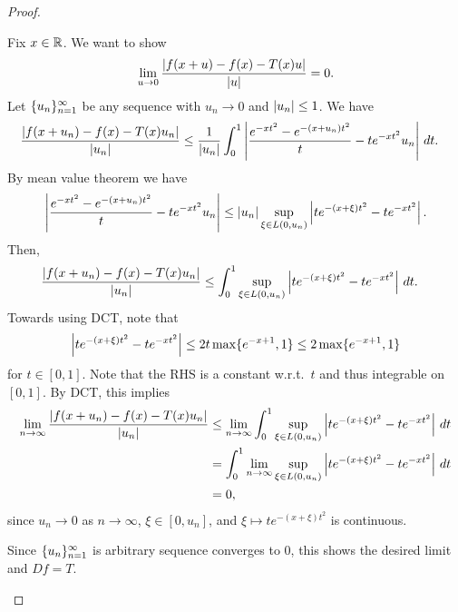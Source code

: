 \documentclass[a4paper]{article}
\begin{document}
\begin{proof}
\begin{enumerate}
          Fix $x \in \mathbb{R}$. We want to show
          \[
            \lim_{u \to 0} \frac{\left\lvert f(x + u) - f(x) - T(x) u\right\rvert}{\left\lvert u\right\rvert} = 0.
          \]
          Let $\{ u_n \}_{n=1}^\infty$ be any sequence with $u_n \to 0$ and
          $\left\lvert u_n\right\rvert \leq 1$. We have
          \begin{align*}
            \frac{\left\lvert f(x + u_n) - f(x) - T(x) u_n\right\rvert}{\left\lvert u_n\right\rvert}
             & \leq \frac{1}{\left\lvert u_n\right\rvert} \int_0^1
            \left\lvert \frac{e^{-x t^2} - e^{-(x + u_n) t^2}}{t}
              - t e^{-x t^2} u_n\right\rvert \, d t.
          \end{align*}
          By mean value theorem we have
          \[
            \left\lvert \frac{e^{-x t^2} - e^{-(x + u_n) t^2}}{t}
              - t e^{-x t^2} u_n\right\rvert \leq \left\lvert u_n\right\rvert \sup_{\xi \in L(0, u_n)}
            \left\lvert t e^{-(x + \xi) t^2} - t e^{-x t^2}\right\rvert.
          \]
          Then,
          \begin{align*}
            \frac{\left\lvert f(x + u_n) - f(x) - T(x) u_n\right\rvert}{\left\lvert u_n\right\rvert}
             & \leq \int_0^1 \sup_{\xi \in L(0, u_n)}
            \left\lvert t e^{-(x + \xi) t^2} - t e^{-x t^2}\right\rvert \, d t.
          \end{align*}
          Towards using DCT, note that
          \[
            \left\lvert t e^{-(x + \xi) t^2} - t e^{-x t^2}\right\rvert
            \leq 2 t \max \{e^{-x + 1}, 1\} \leq 2 \max \{e^{-x + 1}, 1\}
          \]
          for $t \in [0, 1]$. Note that the RHS is a constant w.r.t.\ $t$
          and thus integrable on $[0, 1]$. By DCT, this implies
          \begin{align*}
            \lim_{n \to \infty}
            \frac{\left\lvert f(x + u_n) - f(x) - T(x) u_n\right\rvert}{\left\lvert u_n\right\rvert}
             & \leq \lim_{n \to \infty} \int_0^1 \sup_{\xi \in L(0, u_n)}
            \left\lvert t e^{-(x + \xi) t^2} - t e^{-x t^2}\right\rvert \, d t                \\
             & = \int_0^1 \lim_{n \to \infty}  \sup_{\xi \in L(0, u_n)}
            \left\lvert t e^{-(x + \xi) t^2} - t e^{-x t^2}\right\rvert \, d t                \\
             & = 0,
          \end{align*}
          since $u_n \to 0$ as $n \to \infty$, $\xi \in [0, u_n]$, and
          $\xi \mapsto t e^{-(x + \xi) t^2}$ is continuous.

          Since $\{ u_n \}_{n=1}^\infty$ is arbitrary sequence converges to $0$,
          this shows the desired limit and $Df = T$.


\end{enumerate}
\end{proof}
\end{document}
